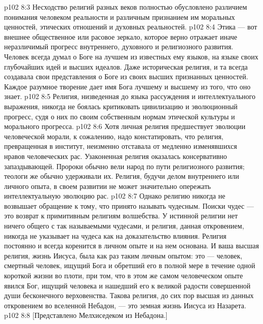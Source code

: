 \vs p102 8:3 Несходство религий разных веков полностью обусловлено различием понимания человеком реальности и различным признанием им моральных ценностей, этических отношений и духовных реальностей.
\vs p102 8:4 \pc Этика --- вот внешнее общественное или расовое зеркало, которое верно отражает иначе неразличимый прогресс внутреннего, духовного и религиозного развития. Человек всегда думал о Боге на лучшем из известных ему языков, на языке своих глубочайших идей и высших идеалов. Даже историческая религия, и та всегда создавала свои представления о Боге из своих высших признанных ценностей. Каждое разумное творение дает имя Бога лучшему и высшему из того, что оно знает.
\vs p102 8:5 Религия, низведенная до языка рассуждения и интеллектуального выражения, никогда не боялась критиковать цивилизацию и эволюционный прогресс, судя о них по своим собственным нормам этической культуры и морального прогресса.
\vs p102 8:6 Хотя личная религия предшествует эволюции человеческой морали, к сожалению, надо констатировать, что религия, превращенная в институт, неизменно отставала от медленно изменявшихся нравов человеческих рас. Узаконенная религия оказалась консервативно запаздывающей. Пророки обычно вели народ по пути религиозного развития; теологи же обычно удерживали их. Религия, будучи делом внутреннего или личного опыта, в своем развитии не может значительно опережать интеллектуальную эволюцию рас.
\vs p102 8:7 Однако религию никогда не возвышает обращение к тому, что принято называть чудесным. Поиски чудес --- это возврат к примитивным религиям волшебства. У истинной религии нет ничего общего с так называемыми чудесами, и религия, данная откровением, никогда не указывает на чудеса как на доказательство влияния. Религия постоянно и всегда коренится в личном опыте и на нем основана. И ваша высшая религия, жизнь Иисуса, была как раз таким личным опытом: это --- человек, смертный человек, ищущий Бога и обретший его в полной мере в течение одной короткой жизни во плоти, при том, что в этом же самом человеческом опыте явился Бог, ищущий человека и нашедший его к великой радости совершенной души бесконечного верховенства. Такова религия, до сих пор высшая из данных откровением во вселенной Небадон, --- это земная жизнь Иисуса из Назарета.
\vsetoff
\vs p102 8:8 [Представлено Мелхиседеком из Небадона.]
